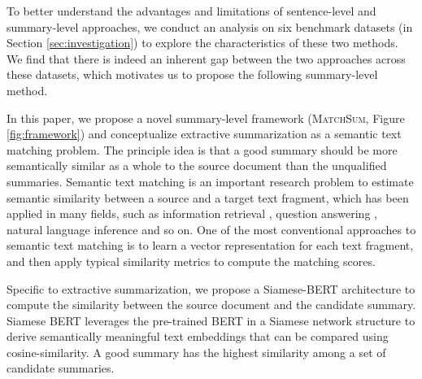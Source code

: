 \documentclass[11pt,a4paper]{article}
\begin{document}
To better understand the advantages and limitations of sentence-level and summary-level approaches, we conduct an analysis on six benchmark datasets (in Section \ref{sec:investigation}) to explore the characteristics of these two methods. We find that there is indeed an inherent gap between the two approaches across these datasets, which motivates us to propose the following summary-level method.










































In this paper, we propose a novel summary-level framework (\textsc{MatchSum}, Figure \ref{fig:framework}) and conceptualize extractive summarization as a semantic text matching problem. The principle idea is that a good summary should be more semantically similar as a whole to the source document than the unqualified summaries.
Semantic text matching is an important research problem to estimate semantic similarity between a source and a target text fragment, which has been applied in many fields, such as information retrieval \cite{mitra2017learning}, question answering \cite{yih2013question, severyn2015learning}, natural language inference \cite{wang2016learning, wang2017bilateral} and so on. One of the most conventional approaches to semantic text matching is to learn a vector representation for each text fragment, and then apply typical similarity metrics to compute the matching scores.

Specific to extractive summarization, we propose a Siamese-BERT architecture to compute the similarity between the source document and the candidate summary. Siamese BERT leverages the pre-trained
BERT \cite{devlin2019bert} in a Siamese network structure \cite{bromley1994signature, hoffer2015deep, reimers2019sentence} to derive semantically meaningful text embeddings that can be compared using cosine-similarity.
A good summary has the highest similarity among a set of candidate summaries.
\end{document}
